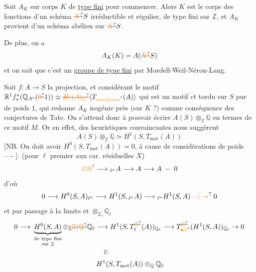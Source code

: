 Soit $A_K$  sur corps $K$ de \uline{type fini} %
pour commencer. Alors $K$ est le corps des %
fonctions d'un schéma $\deleted{\unsure{X}}S$ irréductible et %
régulier, de type fini sur $\mathbb{Z}$, et  $A_K$ %
provient d'un schéma abélien sur $\deleted{\unsure{X}}S$. %

De plus, on a %
\[
 A_K(K)=A(\deleted{\unsure{X}}S) %
\]
et on sait que c'est un \uline{groupe de type %
fini} par Mordell-Weil-Néron-Lang. %

Soit $f:A\longrightarrow S$ la projection, et %
considérant le motif $\mathbb{R}^1 f^{*}_*(\mathbb{Q}_{A^*}(\deleted{\unsure{0}}1))\simeq
\deleted{\unsure{H_1(A)_{\mathbb{Q}}}} \inserted{T_{\text{\unsure{motif|mot}}}(A)}$ %
qui est un motif ct tordu sur $S$  %
pur de poids $1$, qui redonne $A_K$ %
 isogénie près   (sur $K$ ?) comme %
conséquence des conjectures de Tate. %
On s'attend donc à pouvoir écrire %
$A(S)\otimes_{\mathbb{Z}}\mathbb{Q}$ en termes de ce motif $M$. %
Or en effet, des  heuristiques convaincantes %
 nous suggèrent %
\[
 A(S)\otimes_{\mathbb{Z}}\mathbb{Q}\simeq H^1(S,T_{\mathrm{mot}}(A)) %
\]
[NB. On doit avoir $H^0(S,T_{\mathrm{mot}}(A))=0$, %
à cause de  considérations de %
poids ---- ].   (pour $\ell$ premier %
aux car. résiduelles  $X$) %
\[
 \unsure{\varnothing|0}\longrightarrow{}_{\ell^\nu}A\longrightarrow A\longrightarrow A\;-\;0 %
\]
d'où %
\[
 0\longrightarrow H^0(S,A)_{\ell^\nu}\longrightarrow H^1(S,{}_{\ell^\nu}A)
 \longrightarrow{}_{\ell^\nu}H^1(S,A)\;\unsure{-|\to}\;0 %
\]
et par passage à la limite et $\otimes_{\mathbb{Z}_\ell}\mathbb{Q}_\ell$ %
\[
\begin{aligned}
0\longrightarrow {}&
\underbrace{H^0(S,A)}_{\substack{\text{de type fini}\\\text{sur }\mathbb{Z}}}
\otimes_{\mathbb{Z}}\deleted{\unsure{\mathbb{Z}|\mathbb{Q}}}\mathbb{Q}_\ell
 \longrightarrow H^1(S,T_{\ell}^{\deleted{\unsure{\mathbb{Q}}}}(A))_{\mathbb{Q}_\ell}
 \longrightarrow T_{\unsure{\bullet|\ell}}^{\deleted{\unsure{\mathbb{Q}}}}(H^1(S,A))_{\mathbb{Q}_\ell}\to0\\ %
&\hspace{36mm}\rotatebox{90}{$\simeq$}\\ %
&\hspace{32mm}H^1(S,T_{\mathrm{mot}}(A))\otimes_{\mathbb{Q}}\mathbb{Q}_{\ell}
\end{aligned} %
\]
